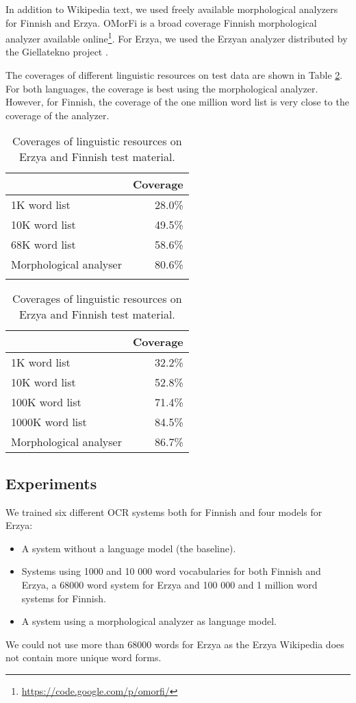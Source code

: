 \documentclass[b5paper]{article}
\begin{document}
In addition to Wikipedia text, we used freely available morphological
analyzers for Finnish and Erzya. OMorFi \cite{pirinen11} is a broad
coverage Finnish morphological analyzer available
online\footnote{\url{https://code.google.com/p/omorfi/}}. For Erzya,
we used the Erzyan analyzer distributed by the Giellatekno project
\cite{moshagen14}.

The coverages of different linguistic resources on test data are shown
in Table \ref{fin-myv-coverage}. For both languages, the coverage is
best using the morphological analyzer. However, for Finnish, the
coverage of the one million word list is very close to the coverage of
the analyzer.

\begin{table}[!htb]
\begin{center}
\begin{tabular}{lr}
\hline 
                        & Coverage  \\
\hline 
1K word list            &   28.0\%  \\
10K word list           &   49.5\%  \\
68K word list           &   58.6\%  \\
Morphological analyser  &   80.6\%  \\
                        &
\end{tabular}
\quad
\begin{tabular}{lr}
\hline 
                        & Coverage \\
\hline 
1K word list            &  32.2\% \\
10K word list           &  52.8\% \\
100K word list          &  71.4\% \\
1000K word list         &  84.5\% \\
Morphological analyser  &  86.7\% 
\end{tabular}
\caption{Coverages of linguistic resources on Erzya and Finnish test material.}\label{fin-myv-coverage}
\end{center}
\end{table}

\subsection{Experiments}
We trained six different OCR systems both for Finnish and four models for Erzya:
\begin{itemize}
\item A system without a language model (the baseline).
\item Systems using 1000 and 10 000 word vocabularies for both Finnish
  and Erzya, a 68000 word system for Erzya and 100 000 and 1 million
  word systems for Finnish.
\item A system using a morphological analyzer as language model.
\end{itemize}
We could not use more than 68000 words for Erzya as the Erzya
Wikipedia does not contain more unique word forms.
\end{document}
